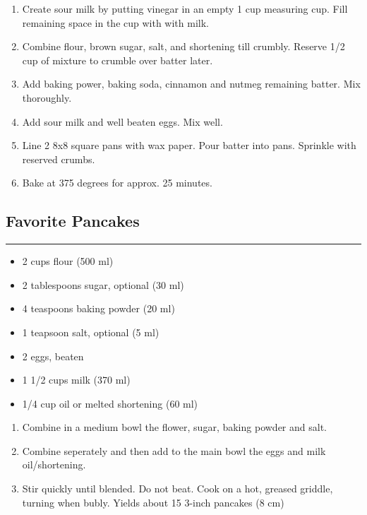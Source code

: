 \documentclass{article}
\begin{document}
\begin{enumerate}
    \item 
        Create sour milk by putting vinegar in an empty 1 cup measuring cup. Fill remaining space in the cup with with milk.
    \item 
        Combine flour, brown sugar, salt, and shortening till crumbly. Reserve 1/2 cup of mixture to crumble over batter later.
    \item 
        Add baking power, baking soda, cinnamon and nutmeg remaining batter. Mix thoroughly.
    \item 
        Add sour milk and well beaten eggs. Mix well.
    \item 
        Line 2 8x8 square pans with wax paper. Pour batter into pans. Sprinkle with reserved crumbs.
    \item 
        Bake at 375 degrees for approx. 25 minutes.
\end{enumerate}
\newpage

\subsection{Favorite Pancakes} 
\noindent\rule[0.5ex]{\linewidth}{1pt}

\begin{framed}
    \begin{itemize}
        \item 2 cups flour (500 ml)
        \item 2 tablespoons sugar, optional (30 ml)
        \item 4 teaspoons baking powder (20 ml)
        \item 1 teapsoon salt, optional (5 ml)
        \item 2 eggs, beaten
        \item 1 1/2 cups milk (370 ml)
        \item 1/4 cup oil or melted shortening (60 ml)
    \end{itemize}
\end{framed}

\begin{enumerate}
    \item 
        Combine in a medium bowl the flower, sugar, baking powder and salt.
    \item 
        Combine seperately and then add to the main bowl the eggs and milk oil/shortening.
    \item 
        Stir quickly until blended. Do not beat. Cook on a hot, greased griddle, turning when bubly. Yields about 15 3-inch pancakes (8 cm)
\end{enumerate}
\end{document}
